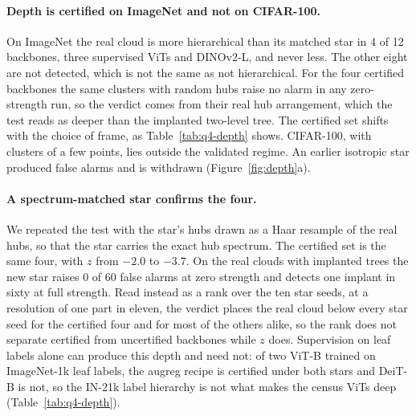 \documentclass{article}
\theoremstyle{definition}
\begin{document}
\paragraph{Depth is certified on ImageNet and not on CIFAR-100.} On ImageNet the real cloud is more hierarchical than its matched star in 4 of 12 backbones, three supervised ViTs and DINOv2-L, and never less. The other eight are not detected, which is not the same as not hierarchical. For the four certified backbones the same clusters with random hubs raise no alarm in any zero-strength run, so the verdict comes from their real hub arrangement, which the test reads as deeper than the implanted two-level tree. The certified set shifts with the choice of frame, as Table~\ref{tab:q4-depth} shows. CIFAR-100, with clusters of a few points, lies outside the validated regime. An earlier isotropic star produced false alarms and is withdrawn (Figure~\ref{fig:depth}a). %

\paragraph{A spectrum-matched star confirms the four.} We repeated the test with the star's hubs drawn as a Haar resample of the real hubs, so that the star carries the exact hub spectrum. The certified set is the same four, with $z$ from $-2.0$ to $-3.7$. On the real clouds with implanted trees the new star raises 0 of 60 false alarms at zero strength and detects one implant in sixty at full strength. Read instead as a rank over the ten star seeds, at a resolution of one part in eleven, the verdict places the real cloud below every star seed for the certified four and for most of the others alike, so the rank does not separate certified from uncertified backbones while $z$ does. Supervision on leaf labels alone can produce this depth and need not: of two ViT-B trained on ImageNet-1k leaf labels, the augreg recipe is certified under both stars and DeiT-B is not, so the IN-21k label hierarchy is not what makes the census ViTs deep (Table~\ref{tab:q4-depth}). %
\end{document}

